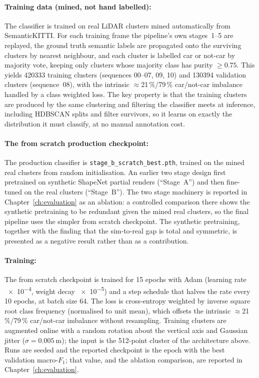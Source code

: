 \documentclass[a4paper,12pt]{report}
\begin{document}
\paragraph{Training data (mined, not hand labelled):} The classifier is trained
on real LiDAR clusters mined automatically from SemanticKITTI. For each training frame the pipeline's own
stages~1--5 are replayed, the ground truth semantic labels are propagated onto the
surviving clusters by nearest neighbour, and each cluster is labelled car
or not-car by majority vote, keeping only clusters whose majority class
has purity $\geq \num{0.75}$. This yields \num{420333} training clusters
(sequences 00--07, 09, 10) and \num{130394} validation clusters (sequence~08),
with the intrinsic $\approx$21\,\%/79\,\% car/not-car imbalance handled by a
class weighted loss. The key property is that the training clusters are produced
by the same clustering and filtering the classifier meets at inference,
including HDBSCAN splits and filter survivors, so it learns on exactly the
distribution it must classify, at no manual annotation cost.

\paragraph{The from scratch production checkpoint:} The production classifier
is \texttt{stage\_b\_\allowbreak scratch\_\allowbreak best.pth}, trained on the
mined real clusters from random initialisation. An earlier
two stage design first pretrained on synthetic ShapeNet partial renders
(``Stage~A'') and then fine-tuned on the real clusters (``Stage~B''). The
two stage machinery is reported in Chapter~\ref{ch:evaluation} as an ablation:
a controlled comparison there shows the synthetic pretraining to be redundant given the
mined real clusters, so the final pipeline uses the simpler from scratch checkpoint. The
synthetic pretraining, together with the finding that the sim-to-real gap is total and
symmetric, is presented as a negative result rather than as a contribution.

\paragraph{Training:} The from scratch checkpoint is trained for \num{15} epochs
with Adam (learning rate \num{e-4}, weight decay \num{e-5}) and a step schedule
that halves the rate every \num{10} epochs, at batch size \num{64}. The loss is
cross-entropy weighted by inverse square root class frequency (normalised to unit
mean), which offsets the intrinsic $\approx$21\,\%/79\,\% car/not-car imbalance
without resampling. Training clusters are augmented online with a random rotation
about the vertical axis and Gaussian jitter ($\sigma = \SI{0.005}{\meter}$); the
input is the \num{512}-point cluster of the architecture above. Runs are seeded
and the reported checkpoint is the epoch with the best validation macro-$F_1$; that
value, and the ablation comparison, are reported in Chapter~\ref{ch:evaluation}.
\end{document}
